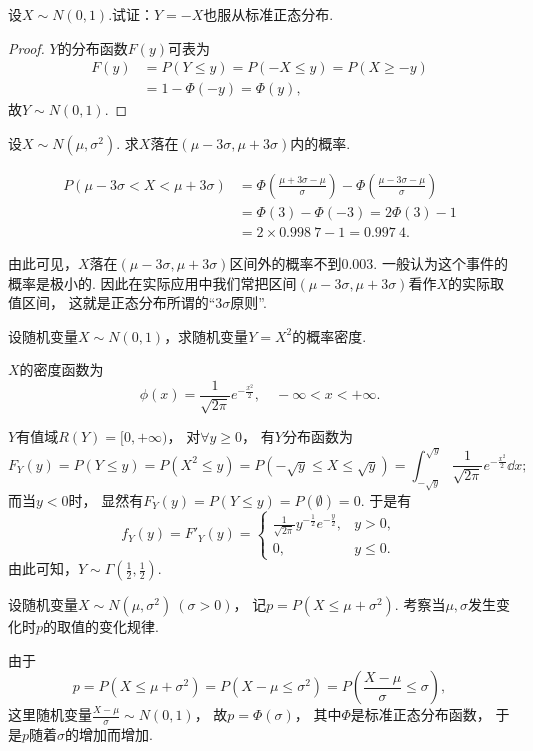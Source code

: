 \begin{example}
设\(X \sim N(0,1)\).试证：\(Y=-X\)也服从标准正态分布.
\begin{proof}
\(Y\)的分布函数\(F(y)\)可表为
\begin{align*}
	F(y) &= P(Y \leq y) = P(-X \leq y) = P(X \geq -y) \\
	&= 1 - \Phi(-y) = \Phi(y),
\end{align*}
故\(Y \sim N(0,1)\).
\end{proof}
\end{example}

\begin{example}
设\(X \sim N(\mu,\sigma^2)\).
求\(X\)落在\((\mu-3\sigma,\mu+3\sigma)\)内的概率.
\begin{solution}
\begin{align*}
	P(\mu-3\sigma<X<\mu+3\sigma)
	&= \Phi\left(\frac{\mu+3\sigma-\mu}{\sigma}\right)
	- \Phi\left(\frac{\mu-3\sigma-\mu}{\sigma}\right) \\
	&= \Phi(3) - \Phi(-3) = 2\Phi(3) - 1 \\
	&= 2 \times 0.998\ 7 - 1 = 0.997\ 4.
\end{align*}
\end{solution}
\end{example}
由此可见，\(X\)落在\((\mu-3\sigma,\mu+3\sigma)\)区间外的概率不到\(0.003\).
一般认为这个事件的概率是极小的.
因此在实际应用中我们常把区间\((\mu-3\sigma,\mu+3\sigma)\)看作\(X\)的实际取值区间，
这就是正态分布所谓的“\(3\sigma\)原则”.

\begin{example}
设随机变量\(X \sim N(0,1)\)，求随机变量\(Y = X^2\)的概率密度.
\begin{solution}
\(X\)的密度函数为\[
	\phi(x) = \frac{1}{\sqrt{2\pi}} e^{-\frac{x^2}{2}},
	\quad -\infty < x < +\infty.
\]

\(Y\)有值域\(R(Y) = [0,+\infty)\)，
对\(\forall y \geq 0\)，
有\(Y\)分布函数为\[
	F_Y(y) = P(Y \leq y) = P(X^2 \leq y)
	= P(-\sqrt{y} \leq X \leq \sqrt{y})
	= \int_{-\sqrt{y}}^{\sqrt{y}}{\frac{1}{\sqrt{2\pi}} e^{-\frac{x^2}{2}} \dd{x}};
\]
而当\(y < 0\)时，
显然有\(F_Y(y) = P(Y \leq y) = P(\emptyset) = 0\).
于是有\[
	f_Y(y)
	= F'_Y(y)
	= \left\{ \begin{array}{ll}
		\frac{1}{\sqrt{2\pi}} y^{-\frac{1}{2}} e^{-\frac{y}{2}}, & y > 0, \\
		0, & y \leq 0.
	\end{array} \right.
\]
由此可知，\(Y \sim \Gamma\left(\frac{1}{2},\frac{1}{2}\right)\).
\end{solution}
\end{example}

\begin{example}
设随机变量\(X \sim N(\mu,\sigma^2)\ (\sigma>0)\)，
记\(p = P(X \leq \mu + \sigma^2)\).
考察当\(\mu,\sigma\)发生变化时\(p\)的取值的变化规律.
\begin{solution}
由于\[
	p = P(X \leq \mu + \sigma^2)
	= P(X - \mu \leq \sigma^2)
	= P\left( \frac{X-\mu}\sigma \leq \sigma \right),
\]
这里随机变量\(\frac{X-\mu}\sigma \sim N(0,1)\)，
故\(p = \Phi(\sigma)\)，
其中\(\Phi\)是标准正态分布函数，
于是\(p\)随着\(\sigma\)的增加而增加.
\end{solution}
\end{example}
